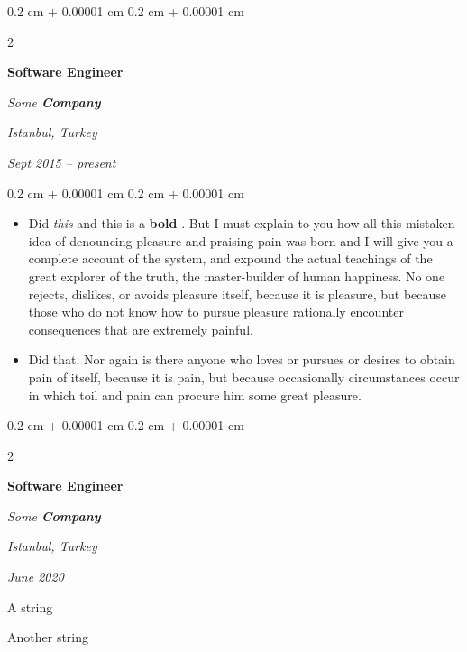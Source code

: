 \documentclass[10pt, letterpaper]{article}
\newenvironment{summary}{
    \begin{description}[
        topsep=0.10 cm,
        parsep=0.10 cm,
        partopsep=0pt,
        itemsep=0pt,
        leftmargin=0.4 cm + 10pt
    ]
}{
    \end{description}
} %
\newenvironment{highlights}{
    \begin{itemize}[
        topsep=0.10 cm,
        parsep=0.10 cm,
        partopsep=0pt,
        itemsep=0pt,
        leftmargin=0.4 cm + 10pt
    ]
}{
    \end{itemize}
} %
\newenvironment{onecolentry}{
    \begin{adjustwidth}{
        0.2 cm + 0.00001 cm
    }{
        0.2 cm + 0.00001 cm
    }
}{
    \end{adjustwidth}
} %
\newenvironment{twocolentry}[2][]{
    \onecolentry
    \def\secondColumn{#2}
    \setcolumnwidth{\fill, 4.5 cm}
    \begin{paracol}{2}
}{
    \switchcolumn \raggedleft \secondColumn
    \end{paracol}
    \endonecolentry
} %
\let\hrefWithoutArrow\href
\renewcommand{\href}[2]{\hrefWithoutArrow{#1}{\ifthenelse{\equal{#2}{}}{ }{#2 }\raisebox{.15ex}{\footnotesize \faExternalLink*}}}
\begin{document}
        \vspace{0.2 cm}

        \begin{twocolentry}{
        \textit{Istanbul, Turkey}    
            
        \textit{Sept 2015 – present}}
            \textbf{Software Engineer}
            
            \textit{Some \textbf{Company}}
        \end{twocolentry}
        \vspace{0.10 cm}
        \begin{onecolentry}
            \begin{highlights}
                \item Did \textit{this} and this is a \textbf{bold} \href{https://example.com}{link}. But I must explain to you how all this mistaken idea of denouncing pleasure and praising pain was born and I will give you a complete account of the system, and expound the actual teachings of the great explorer of the truth, the master-builder of human happiness. No one rejects, dislikes, or avoids pleasure itself, because it is pleasure, but because those who do not know how to pursue pleasure rationally encounter consequences that are extremely painful.
                \item Did that. Nor again is there anyone who loves or pursues or desires to obtain pain of itself, because it is pain, but because occasionally circumstances occur in which toil and pain can procure him some great pleasure.
            \end{highlights}
        \end{onecolentry}


        \vspace{0.2 cm}

        \begin{twocolentry}{
        \textit{Istanbul, Turkey}    
            
        \textit{June 2020}}
            \textbf{Software Engineer}
            
            \textit{Some \textbf{Company}}
        \end{twocolentry}
            \begin{summary}
                \item A string
                \item Another string
            \end{summary}


        \vspace{0.2 cm}
\end{document}
